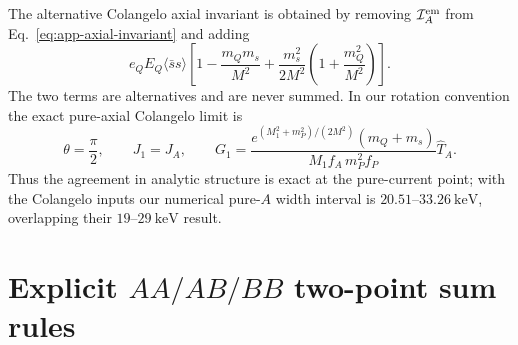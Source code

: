 \documentclass[11pt]{article}
\newcommand{\keV}{\mathrm{keV}}
\newcommand{\ssbar}{\langle\bar s s\rangle}
\begin{document}
\begin{table}[htbp]
 \centering
 \caption{Separation of the transition and two-point condensate prescriptions.}
 \label{tab:app-local-schemes}
\end{table}

The alternative Colangelo axial invariant is obtained by removing
$\mathcal I_A^{\rm em}$ from Eq.~\eqref{eq:app-axial-invariant} and adding
\begin{equation}
 e_QE_Q\ssbar\left[1-\frac{m_Qm_s}{M^2}
 +\frac{m_s^2}{2M^2}\left(1+\frac{m_Q^2}{M^2}\right)\right].
 \label{eq:app-colangelo-local}
\end{equation}
The two terms are alternatives and are never summed.  In our rotation
convention the exact pure-axial Colangelo limit is
\begin{equation}
 \theta=\frac{\pi}{2},\qquad J_1=J_A,\qquad
 G_1=\frac{e^{(M_1^2+m_P^2)/(2M^2)}(m_Q+m_s)}
 {M_1f_A\,m_P^2f_P}\widehat T_A .
 \label{eq:app-colangelo-limit}
\end{equation}
Thus the agreement in analytic structure is exact at the pure-current point;
with the Colangelo inputs our numerical pure-$A$ width interval is
$20.51$--$33.26~\keV$, overlapping their $19$--$29~\keV$ result.

\section{Explicit \texorpdfstring{$AA/AB/BB$}{AA/AB/BB} two-point sum rules}
\label{app:two-point}
\end{document}
